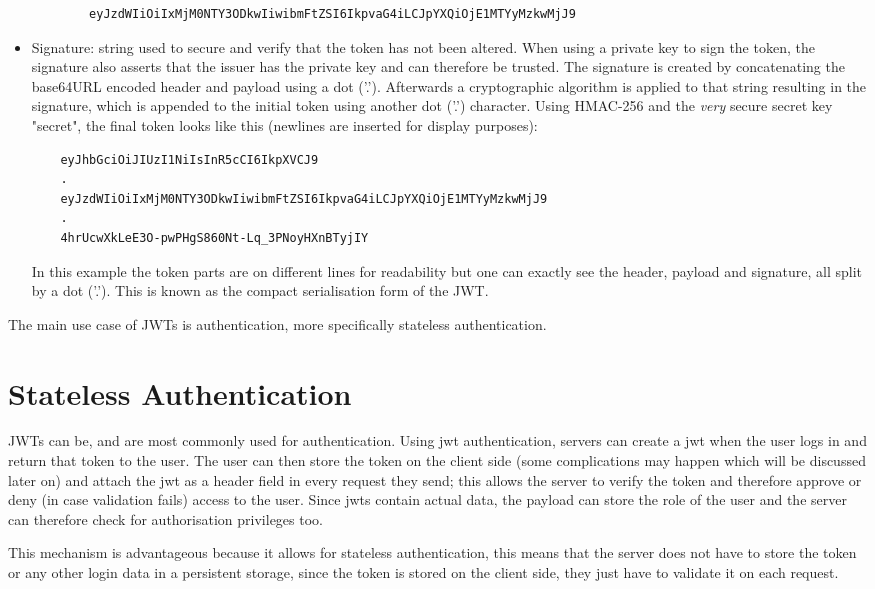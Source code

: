 \begin{itemize}
    \begin{lstlisting}
        eyJzdWIiOiIxMjM0NTY3ODkwIiwibmFtZSI6IkpvaG4iLCJpYXQiOjE1MTYyMzkwMjJ9
    \end{lstlisting}
    \item Signature: string used to secure and verify that the token has not been altered. When using a private key to sign the token, the signature also asserts that the issuer has the private key and can therefore be trusted. The signature is created by concatenating the base64URL encoded header and payload using a dot ('.'). Afterwards a cryptographic algorithm is applied to that string resulting in the signature, which is appended to the initial token using another dot ('.') character. Using HMAC-256 and the \textit{very} secure secret key "secret", the final token looks like this (newlines are inserted for display purposes):
    \begin{lstlisting}
    eyJhbGciOiJIUzI1NiIsInR5cCI6IkpXVCJ9
    .
    eyJzdWIiOiIxMjM0NTY3ODkwIiwibmFtZSI6IkpvaG4iLCJpYXQiOjE1MTYyMzkwMjJ9
    .
    4hrUcwXkLeE3O-pwPHgS860Nt-Lq_3PNoyHXnBTyjIY
    \end{lstlisting}
    In this example the token parts are on different lines for readability but one can exactly see the header, payload and signature, all split by a dot ('.'). This is known as the compact serialisation form of the JWT.
\end{itemize}
\cite{rfc7519-jwt} \cite{jwt-handbook}

The main use case of JWTs is authentication, more specifically stateless authentication.

\section{Stateless Authentication}
JWTs can be, and are most commonly used for authentication. Using \gls{jwt} authentication, servers can create a \gls{jwt} when the user logs in and return that token to the user. The user can then store the token on the client side (some complications may happen which will be discussed later on) and attach the \gls{jwt} as a header field in every request they send; this allows the server to verify the token and therefore approve or deny (in case validation fails) access to the user. Since \gls{jwt}s contain actual data, the payload can store the role of the user and the server can therefore check for authorisation privileges too. 

This mechanism is advantageous because it allows for stateless authentication, this means that the server does not have to store the token or any other login data in a persistent storage, since the token is stored on the client side, they just have to validate it on each request.

